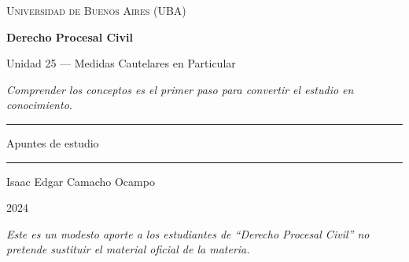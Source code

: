 \documentclass[12pt,oneside]{book}
\newcommand{\universidad}{Universidad de Buenos Aires (UBA)}
\newcommand{\materia}{Derecho Procesal Civil}
\newcommand{\titulo}{Unidad 25 --- Medidas Cautelares en Particular}
\newcommand{\autor}{Isaac Edgar Camacho Ocampo}
\newcommand{\anio}{2024}
\begin{document}
\begin{titlepage}

\thispagestyle{empty}

\begin{center}

\vspace*{1cm}

{\large \textsc{\universidad}}

\vspace{3cm}

{\Huge \textbf{\materia}}

\vspace{1cm}

{\LARGE \titulo}

\vspace{0.8cm}

\textit{Comprender los conceptos es el primer paso para convertir el estudio en conocimiento.}

\vspace{1.2cm}

\rule{0.70\textwidth}{0.5pt}

\vspace{0.5cm}

{\large Apuntes de estudio}

\vspace{0.5cm}

\rule{0.70\textwidth}{0.5pt}

\vfill

{\large \autor}

\vspace{0.3cm}

{\large \anio}

\end{center}

\vfill

\begin{flushleft}
\textit{Este es un modesto aporte a los estudiantes de ``Derecho Procesal Civil'' no pretende sustituir el material oficial de la materia.}
\end{flushleft}

\end{titlepage}

\tableofcontents

\end{document}
